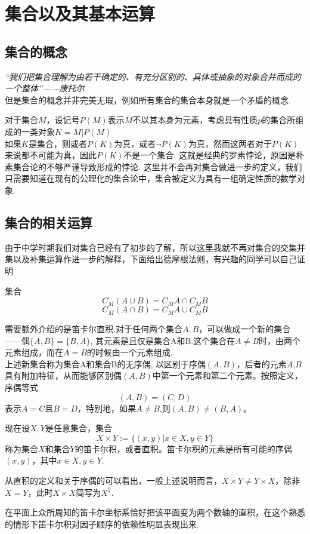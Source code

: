 \section{集合以及其基本运算}
\subsection{集合的概念}
{\large\textit{“我们把集合理解为由若干确定的、有充分区别的、具体或抽象的对象合并而成的一个整体”——康托尔}}\\


但是集合的概念并非完美无瑕，例如所有集合的集合本身就是一个矛盾的概念. 

对于集合$M$，设记号$P(M)$表示$M$不以其本身为元素，考虑具有性质$p$的集合所组成的一类对象$K={M|P(M)}$\\
如果$K$是集合，则或者$P(K)$为真，或者$\neg P(K)$为真，然而这两者对于$P(K)$来说都不可能为真，因此$P(K)$不是一个集合. 
这就是经典的罗素悖论，原因是朴素集合论的不够严谨导致形成的悖论. 
这里并不会再对集合做进一步的定义，我们只需要知道在现有的公理化的集合论中，集合被定义为具有一组确定性质的数学对象. 
\subsection{集合的相关运算}
由于中学时期我们对集合已经有了初步的了解，所以这里我就不再对集合的交集并集以及补集运算作进一步的解释，下面给出德摩根法则，有兴趣的同学可以自己证明
\begin{definition}{集合}{}
		\[C_M(A\cup   B)=C_MA\cap C_MB \]
        \[C_M(A\cap B)=C_MA\cup C_MB \]
	\end{definition}%
需要额外介绍的是笛卡尔直积.对于任何两个集合$A,B$，可以做成一个新的集合——偶$\{A,B\}=\{B,A\}$, 其元素是且仅是集合A和B.这个集合在$A\neq B$时，由两个元素组成，而在$A=B$的时候由一个元素组成. \\

上述新集合称为集合A和集合B的无序偶, 以区别于序偶$(A,B)$，后者的元素$A$,$B$具有附加特征，从而能够区别偶$(A,B)$中第一个元素和第二个元素。按照定义，序偶等式
\[(A,B)=(C,D)\]
表示$A=C$且$B=D$，特别地，如果$A\neq B$,则$(A,B)\neq (B,A)$。

现在设$X,Y$是任意集合，集合
\[X\times Y:=\{(x,y)|x\in X,y\in Y\}\]
称为集合$X$和集合$Y$的笛卡尔积，或者直积。笛卡尔积的元素是所有可能的序偶$(x,y)$，其中$x\in X,y\in Y$. 

从直积的定义和关于序偶的可以看出，一般上述说明而言，$X\times Y\neq Y\times X$，除非$X=Y$，此时$X\times X$简写为$X^2$. 

在平面上众所周知的笛卡尔坐标系恰好把该平面变为两个数轴的直积，在这个熟悉的情形下笛卡尔积对因子顺序的依赖性明显表现出来. 

